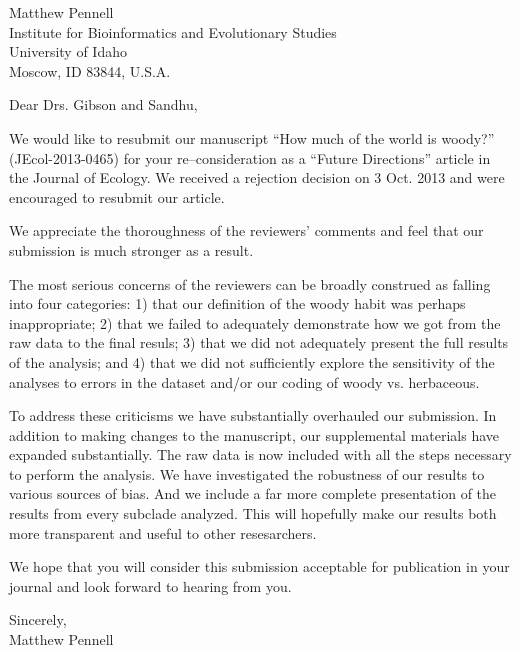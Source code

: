 \documentclass[a4paper,12pt]{article}
\begin{document}
{\raggedleft
  Matthew Pennell\\
  Institute for Bioinformatics and Evolutionary Studies\\
  University of Idaho\\
 Moscow, ID 83844, U.S.A.\\[2ex]
}

\vspace{3ex}

Dear Drs. Gibson and Sandhu,

We would like to resubmit our manuscript ``How much of the world is woody?'' (JEcol-2013-0465) 
for your re--consideration as a ``Future Directions'' article in the Journal of Ecology.
We received a rejection decision on 3 Oct. 2013 and were encouraged to resubmit our article.

We appreciate the thoroughness of the reviewers' comments and feel that our submission is much 
stronger as a result.

The most serious concerns of the reviewers can be broadly construed as falling into four categories:
1) that our definition of the woody habit was perhaps inappropriate; 2) that we failed to adequately
demonstrate how we got from the raw data to the final resuls; 3) that we did not adequately 
present the full results of the analysis; and 4) that we did not sufficiently explore the sensitivity
of the analyses to errors in the dataset and/or our coding of woody vs. herbaceous.

To address these criticisms we have substantially overhauled our submission. In addition to making changes
to the manuscript, our supplemental materials have expanded substantially. The raw data is now
included with all the steps necessary to perform the analysis. We have investigated the robustness of 
our results to various sources of bias. And we include a far more complete presentation of the results
from every subclade analyzed. This will hopefully make our results both more transparent and useful
to other resesarchers.

We hope that you will consider this submission acceptable for publication in your journal and 
look forward to hearing from you.


\begin{flushright}
\vspace{2ex}
\hspace{.2\textwidth}Sincerely,\\
\hspace*{.3\textwidth}
Matthew Pennell
\end{flushright}
\end{document}
